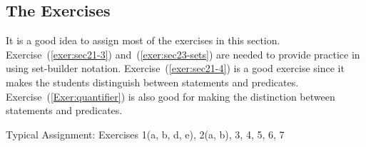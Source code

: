 %
\subsection*{The Exercises}

It is a good idea to assign most of the exercises in this section.  Exercise~(\ref{exer:sec21-3}) and~(\ref{exer:sec23-sets}) are needed to provide practice in using set-builder notation.  Exercise~(\ref{exer:sec21-4}) is a good exercise since it makes the students distinguish between statements and predicates.  Exercise~(\ref{Exer:quantifier}) is also good for making the distinction between statements and predicates.

\vskip6pt
\noindent
Typical Assignment:  Exercises 1(a, b, d, e), 2(a, b), 3, 4, 5, 6, 7
\hbreak
\endinput
